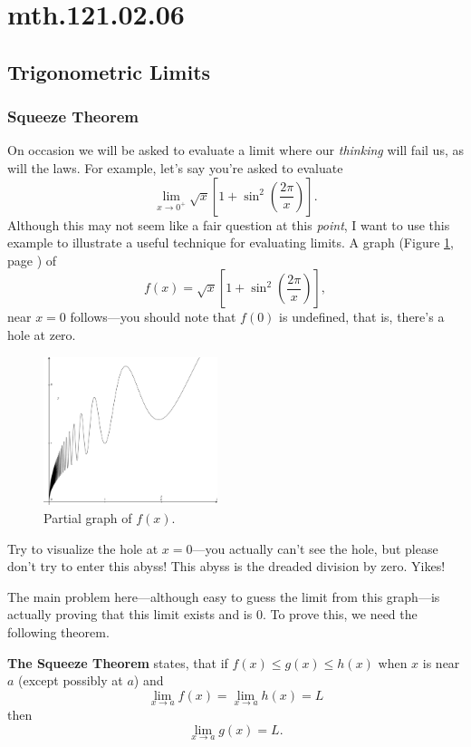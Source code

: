 \documentclass[12pt,addpoints, answers, fleqn]{exam}
\begin{document}
\section{mth.121.02.06}
\subsection{Trigonometric Limits}

\subsubsection{Squeeze Theorem}
On occasion we will be asked to evaluate a limit where our \emph{thinking} will fail us, as will the laws. For example, let's say you're asked to evaluate
\[
\mathop {\lim }\limits_{x \to 0^+}
\sqrt{x}\left[ 1 + \sin^2 \left( \frac{2 \pi}{x} \right) \right].
\]
Although this may not seem like a fair question at this \emph{point}, I want to use this example to illustrate a useful technique for evaluating limits. A graph (Figure \ref{fig:graph0602}, page \pageref{fig:graph0602}) of
\[
f\left(x\right) = 
\sqrt{x}\left[ 1 + \sin^2 \left( \frac{2 \pi}{x} \right) \right],
\]
near $x=0$ follows---you should note that $f\left(0\right)$ is undefined, that is, there's a hole at zero.
\begin{figure}[htbp] %
   \centering
   \includegraphics[width=2in]{./graphics/graph0602.pdf} 
   \caption{Partial graph of $f\left(x\right)$.}
   \label{fig:graph0602}
\end{figure}
Try to visualize the hole at $x=0$---you actually can't see the hole, but please don't try to enter this abyss! This abyss is the dreaded division by zero. Yikes!


The main problem here---although easy to guess the limit from this graph---is actually proving that this limit exists and is $0$. To prove this, we need the following theorem.



\textbf{The Squeeze Theorem} states, that if $f \left( x \right) \leq g \left( x \right) \leq h \left( x \right)$ when $x$ is near $a$ (except possibly at $a$) and
\[
\mathop {\lim }\limits_{x \to a} f \left( x \right) = \mathop {\lim }\limits_{x \to a} h \left( x \right) = L
\]
then
\[
\mathop {\lim }\limits_{x \to a} g \left( x \right) = L.
\]
\end{document}
